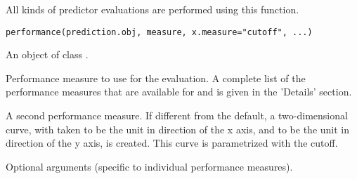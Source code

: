 \begin{Description}\relax
All kinds of predictor evaluations are performed using
this function.
\end{Description}
\begin{Usage}
\begin{verbatim}
performance(prediction.obj, measure, x.measure="cutoff", ...)
\end{verbatim}
\end{Usage}
\begin{Arguments}
\begin{ldescription}
\item[\code{prediction.obj}] An object of class .
\item[\code{measure}] Performance measure to use for the evaluation. A
complete list of the performance measures that are available for 
and  is given in the 'Details' section.
\item[\code{x.measure}] A second performance measure. If different from the
default, a two-dimensional curve, with  taken to be the
unit in direction of the x axis, and  to be the unit in
direction of the y axis, is created. This curve is parametrized with
the cutoff.
\item[\code{...}] Optional arguments (specific to individual performance
measures).
\end{ldescription}
\end{Arguments}
